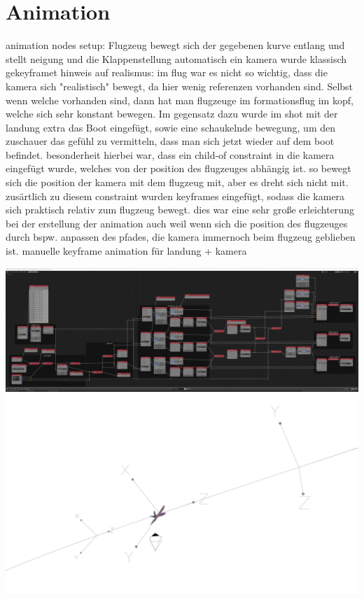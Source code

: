 \section{Animation}

animation nodes setup: Flugzeug bewegt sich der gegebenen kurve entlang und stellt neigung und die Klappenstellung automatisch ein
kamera wurde klassisch gekeyframet
hinweis auf realismus: im flug war es nicht so wichtig, dass die kamera sich "realistisch" bewegt, da hier wenig referenzen vorhanden sind. Selbst wenn welche vorhanden sind, dann hat man flugzeuge im formationsflug im kopf, welche sich sehr konstant bewegen.
Im gegensatz dazu wurde im shot mit der landung extra das Boot eingefügt, sowie eine schaukelnde bewegung, um den zuschauer das gefühl zu vermitteln, dass man sich jetzt wieder auf dem boot befindet.
besonderheit hierbei war, dass ein child-of constraint in die kamera eingefügt wurde, welches von der position des flugzeuges abhängig ist.
so bewegt sich die position der kamera mit dem flugzeug mit, aber es dreht sich nicht mit. zusärtlich zu diesem constraint wurden keyframes eingefügt, sodass die kamera sich praktisch relativ zum flugzeug bewegt.
dies war eine sehr große erleichterung bei der erstellung der animation
auch weil wenn sich die position des flugzeuges durch bspw. anpassen des pfades, die kamera immernoch beim flugzeug geblieben ist.
manuelle keyframe animation für landung + kamera

\includegraphics[width=\textwidth]{gfx/prod/plane/animation_nodes.jpg}
\includegraphics[width=\textwidth]{gfx/prod/plane/an_flight.jpg}

